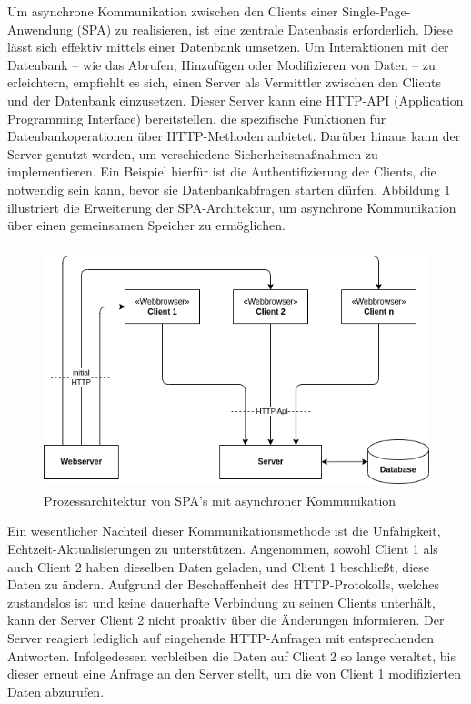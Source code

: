 \documentclass[12pt]{book}          %
\begin{document}
Um asynchrone Kommunikation zwischen den Clients einer Single-Page-Anwendung (SPA) zu realisieren, ist eine zentrale Datenbasis erforderlich. Diese lässt sich effektiv mittels einer Datenbank umsetzen. Um Interaktionen mit der Datenbank – wie das Abrufen, Hinzufügen oder Modifizieren von Daten – zu erleichtern, empfiehlt es sich, einen Server als Vermittler zwischen den Clients und der Datenbank einzusetzen. Dieser Server kann eine HTTP-API (Application Programming Interface) bereitstellen, die spezifische Funktionen für Datenbankoperationen über HTTP-Methoden anbietet. Darüber hinaus kann der Server genutzt werden, um verschiedene Sicherheitsmaßnahmen zu implementieren. Ein Beispiel hierfür ist die Authentifizierung der Clients, die notwendig sein kann, bevor sie Datenbankabfragen starten dürfen. Abbildung \ref{spa-async-comm-architecture} illustriert die Erweiterung der SPA-Architektur, um asynchrone Kommunikation über einen gemeinsamen Speicher zu ermöglichen.

\begin{figure}[htbp]
\centering
\includegraphics[height=7cm]{abbildungen/spa/spa-async-comm.png}
\caption{Prozessarchitektur von SPA's mit asynchroner Kommunikation} 
\label{spa-async-comm-architecture}
\end{figure}

Ein wesentlicher Nachteil dieser Kommunikationsmethode ist die Unfähigkeit, Echtzeit-Aktualisierungen zu unterstützen. Angenommen, sowohl Client 1 als auch Client 2 haben dieselben Daten geladen, und Client 1 beschließt, diese Daten zu ändern. Aufgrund der Beschaffenheit des HTTP-Protokolls, welches zustandslos ist und keine dauerhafte Verbindung zu seinen Clients unterhält, kann der Server Client 2 nicht proaktiv über die Änderungen informieren. Der Server reagiert lediglich auf eingehende HTTP-Anfragen mit entsprechenden Antworten. Infolgedessen verbleiben die Daten auf Client 2 so lange veraltet, bis dieser erneut eine Anfrage an den Server stellt, um die von Client 1 modifizierten Daten abzurufen.
\end{document}
